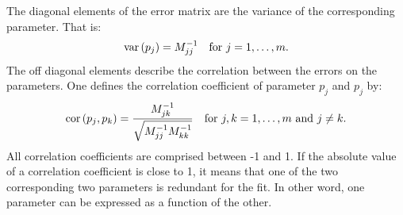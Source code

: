 The diagonal elements of the error matrix are the variance of the
corresponding parameter. That is:
\begin{equation}
\mathop{\textrm{var}}\left(p_j\right)=M_{jj}^{-1}\mbox{\quad for $j=1,\ldots,m$}.
\end{equation}
The off diagonal elements describe the correlation between the
errors on the parameters. One defines the correlation coefficient
of parameter $p_j$ and $p_j$ by:
\begin{equation}
  \mathop{\textrm{cor}}\left(p_j,p_k\right)={\displaystyle M_{jk}^{-1}
  \over\displaystyle\sqrt{M_{jj}^{-1}M_{kk}^{-1}}}\mbox{\quad for
$j,k=1,\ldots,m$ and $j\ne k$}.
\end{equation}
All correlation coefficients are comprised between -1 and 1. If
the absolute value of a correlation coefficient is close to 1, it
means that one of the two corresponding two parameters is
redundant for the fit. In other word, one parameter can be
expressed as a function of the other.

